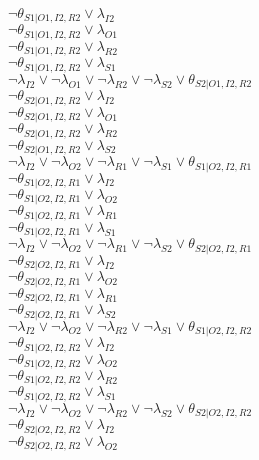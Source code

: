$\neg\theta_{S1|O1,I2,R2} \vee \lambda_{I2}$\\
$\neg\theta_{S1|O1,I2,R2} \vee \lambda_{O1}$\\
$\neg\theta_{S1|O1,I2,R2} \vee \lambda_{R2}$\\
$\neg\theta_{S1|O1,I2,R2} \vee \lambda_{S1}$\\
$\neg\lambda_{I2} \vee \neg\lambda_{O1} \vee \neg\lambda_{R2} \vee \neg\lambda_{S2} \vee \theta_{S2|O1,I2,R2}$\\
$\neg\theta_{S2|O1,I2,R2} \vee \lambda_{I2}$\\
$\neg\theta_{S2|O1,I2,R2} \vee \lambda_{O1}$\\
$\neg\theta_{S2|O1,I2,R2} \vee \lambda_{R2}$\\
$\neg\theta_{S2|O1,I2,R2} \vee \lambda_{S2}$\\
$\neg\lambda_{I2} \vee \neg\lambda_{O2} \vee \neg\lambda_{R1} \vee \neg\lambda_{S1} \vee \theta_{S1|O2,I2,R1}$\\
$\neg\theta_{S1|O2,I2,R1} \vee \lambda_{I2}$\\
$\neg\theta_{S1|O2,I2,R1} \vee \lambda_{O2}$\\
$\neg\theta_{S1|O2,I2,R1} \vee \lambda_{R1}$\\
$\neg\theta_{S1|O2,I2,R1} \vee \lambda_{S1}$\\
$\neg\lambda_{I2} \vee \neg\lambda_{O2} \vee \neg\lambda_{R1} \vee \neg\lambda_{S2} \vee \theta_{S2|O2,I2,R1}$\\
$\neg\theta_{S2|O2,I2,R1} \vee \lambda_{I2}$\\
$\neg\theta_{S2|O2,I2,R1} \vee \lambda_{O2}$\\
$\neg\theta_{S2|O2,I2,R1} \vee \lambda_{R1}$\\
$\neg\theta_{S2|O2,I2,R1} \vee \lambda_{S2}$\\
$\neg\lambda_{I2} \vee \neg\lambda_{O2} \vee \neg\lambda_{R2} \vee \neg\lambda_{S1} \vee \theta_{S1|O2,I2,R2}$\\
$\neg\theta_{S1|O2,I2,R2} \vee \lambda_{I2}$\\
$\neg\theta_{S1|O2,I2,R2} \vee \lambda_{O2}$\\
$\neg\theta_{S1|O2,I2,R2} \vee \lambda_{R2}$\\
$\neg\theta_{S1|O2,I2,R2} \vee \lambda_{S1}$\\
$\neg\lambda_{I2} \vee \neg\lambda_{O2} \vee \neg\lambda_{R2} \vee \neg\lambda_{S2} \vee \theta_{S2|O2,I2,R2}$\\
$\neg\theta_{S2|O2,I2,R2} \vee \lambda_{I2}$\\
$\neg\theta_{S2|O2,I2,R2} \vee \lambda_{O2}$\\

